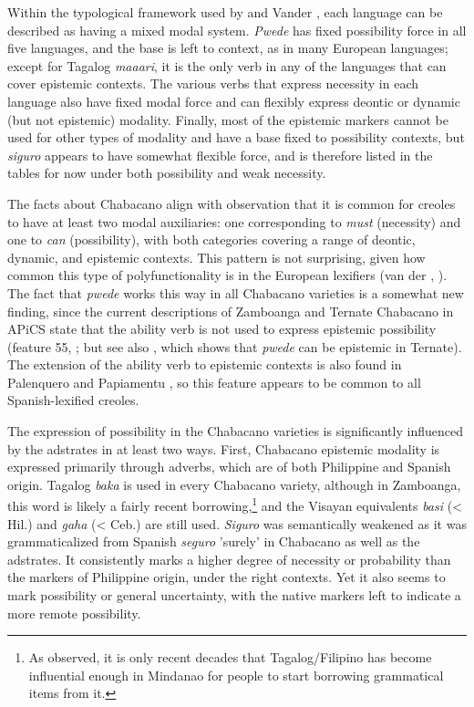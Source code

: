 \documentclass[output=paper]{langsci/langscibook}
\begin{document}
Within the typological framework used by \citet{MatthewsonEtAl2005} and Vander \citet{Klok2013}, each language can be described as having a mixed modal system. \textit{Pwede} has fixed possibility force in all five languages, and the base is left to context, as in many European languages; except for Tagalog \textit{maaari}, it is the only verb in any of the languages that can cover epistemic contexts. The various verbs that express necessity in each language also have fixed modal force and can flexibly express deontic or dynamic (but not epistemic) modality. Finally, most of the epistemic markers cannot be used for other types of modality and have a base fixed to possibility contexts, but \textit{siguro} appears to have somewhat flexible force, and is therefore listed in the tables for now under both possibility and weak necessity. 

The facts about Chabacano align with  observation that it is common for creoles to have at least two modal auxiliaries: one corresponding to \textit{must} (necessity) and one to \textit{can} (possibility), with both categories covering a range of deontic, dynamic, and epistemic contexts. This pattern is not surprising, given how common this type of polyfunctionality is in the European lexifiers (van der \citealt{AuweraEtAl2005}, \citealt{MatthewsonEtAl2005}). The fact that \textit{pwede} works this way in all Chabacano varieties is a somewhat new finding, since the current descriptions of Zamboanga and Ternate Chabacano in APiCS state that the ability verb is not used to express epistemic possibility (feature 55, \citealt{MaurerEtAl2013}; but see also \citealt{Sippola2011}, which shows that \textit{pwede} can be epistemic in Ternate). The extension of the ability verb to epistemic contexts is also found in Palenquero and Papiamentu \citep{MaurerEtAl2013}, so this feature appears to be common to all Spanish-lexified creoles. 

The expression of possibility in the Chabacano varieties is significantly influenced by the adstrates in at least two ways. First, Chabacano epistemic modality is expressed primarily through adverbs, which are of both Philippine and Spanish origin. Tagalog \textit{baka} is used in every Chabacano variety, although in Zamboanga, this word is likely a fairly recent borrowing,\footnote{As \citet[461]{Lipski2013} observed, it is only recent decades that Tagalog/Filipino has become influential enough in Mindanao for people to start borrowing grammatical items from it.} and the Visayan equivalents \textit{basi} (< Hil.) and \textit{gaha} (< Ceb.) are still used. \textit{Siguro} was semantically weakened as it was grammaticalized from Spanish \textit{seguro} {}'surely' in Chabacano as well as the adstrates. It consistently marks a higher degree of necessity or probability than the markers of Philippine origin, under the right contexts. Yet it also seems to mark possibility or general uncertainty, with the native markers left to indicate a more remote possibility. 
\end{document}
